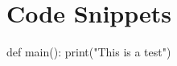 \chapter{Code Snippets}
\label{sec:appendix_a}
\begin{python}
def main():
    print("This is a test")
\end{python}